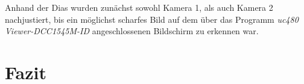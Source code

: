 \documentclass[12pt,a4paper]{article}
\begin{document}
	Anhand der Dias wurden zunächst sowohl Kamera 1, als auch Kamera 2 nachjustiert, bis ein möglichst scharfes Bild auf dem über das Programm \textit{uc480 Viewer-DCC1545M-ID} angeschlossenen Bildschirm zu erkennen war. %
		
	
	
	\clearpage
	\newpage
	
	\section{Fazit} %
	
	
	\newpage
	\clearpage
	
	
	
	\newpage
	\clearpage
	
	
	
	
	
	
	\newpage
	
	\listoffigures %
	
	
	
\end{document}
